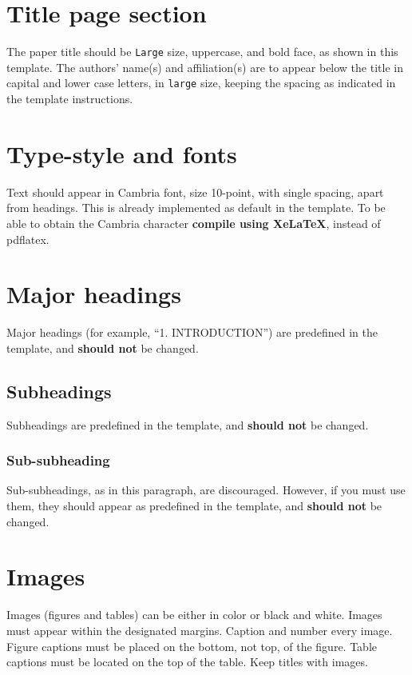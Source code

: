 \documentclass[a4paper,twocolumn]{article}
\begin{document}
\section{Title page section}
\label{sec:sec3}
The paper title should be \texttt{Large} size, uppercase, and bold face, as shown in this template.
The authors' name(s) and affiliation(s) are to appear below the title in capital and lower case letters, in \texttt{large} size, keeping the spacing as indicated in the template instructions.


\section{Type-style and fonts}
\label{sec:sec4}
Text should appear in Cambria font, size 10-point, with single spacing, apart from headings.
This is already implemented as default in the template.
To be able to obtain the Cambria character \textbf{compile using XeLaTeX}, instead of pdflatex.


\section{Major headings}
\label{sec:sec5}
Major headings (for example, ``1. INTRODUCTION'') are predefined in the template, and \textbf{should not} be changed.

\subsection{Subheadings}
\label{ssec:sec5.1}
Subheadings are predefined in the template, and \textbf{should not} be changed.

\subsubsection{Sub-subheading}
\label{sssec:sec5.1.1}
Sub-subheadings, as in this paragraph, are discouraged.
However, if you must use them, they should appear as predefined in the template, and \textbf{should not} be changed.


\section{Images}
\label{sec:sec6}
Images (figures and tables) can be either in color or black and white.
Images must appear within the designated margins.
Caption and number every image.
Figure captions must be placed on the bottom, not top, of the figure.
Table captions must be located on the top of the table.
Keep titles with images. 
\end{document}
